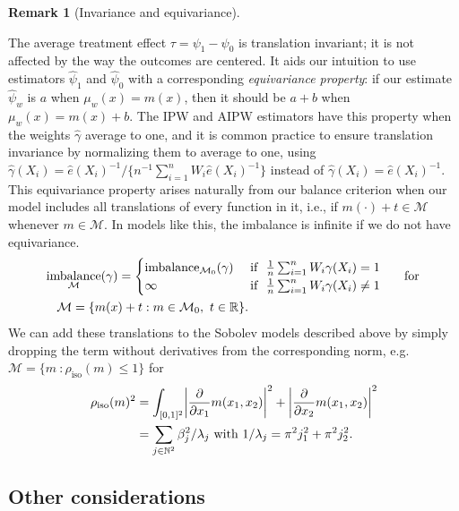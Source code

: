 \documentclass{article}
\DeclarePairedDelimiter\abs{\lvert}{\rvert}
\DeclarePairedDelimiter\set{\{}{\}}
\theoremstyle{definition}
\newtheorem{remark}{Remark}
\newcommand{\R}{\ensuremath{\mathbb{R}}}
\DeclareMathOperator{\imbalance}{imbalance}
\newcommand{\model}{\mathcal{M}}
\newcommand{\<}{\langle}
\renewcommand{\>}{\rangle}
\begin{document}


\begin{remark}[Invariance and equivariance]
\label{sec:translation-invariance}

The average treatment effect $\tau = \psi_1 - \psi_0$ is translation invariant; it is not affected by the way the outcomes are centered. It aids our intuition to use estimators $\hat\psi_1$ and $\hat\psi_0$ with a corresponding \emph{equivariance property}: if our estimate $\hat\psi_w$ is $a$ when $\mu_w(x)=m(x)$, then it should be $a + b$ when $\mu_w(x)=m(x) + b$. The IPW and AIPW estimators have this property when the weights $\hat\gamma$ average to one, and it is common practice to ensure translation invariance by normalizing them to average to one, using $\hat\gamma(X_i) = \hat e(X_i)^{-1} / \{ n^{-1} \sum_{i=1}^n W_i \hat e(X_i)^{-1}\}$ instead of $\hat \gamma(X_i)=\hat e(X_i)^{-1}$.
This equivariance property arises naturally from our balance criterion when our model includes all translations of every function in it, i.e., if $m(\cdot) + t \in \model$ whenever $m \in \model$. In models like this, the imbalance is infinite if we do not have equivariance.
  \[
   \begin{aligned}
   &\imbalance_{\model}(\gamma) =
     \begin{cases}
       \imbalance_{\model_0}(\gamma) & \text{ if }\ \frac{1}{n}\sum_{i=1}^n W_i \gamma(X_i) = 1\\
       \infty &  \text{ if }\ \frac{1}{n}\sum_{i=1}^n W_i \gamma(X_i) \neq 1
   \end{cases}
   \quad\ \text{ for } \\ &\quad \model = \set*{ m(x) + t : m \in \model_0,\  t \in \R}.
  \end{aligned}
   \]
We can add these translations to the Sobolev models described above by simply dropping the term without derivatives from the corresponding norm, e.g. $\model = \{ m \ : \rho_{\text{iso}}(m) \le 1 \}$ for
\begin{align}
\rho_{\text{iso}}(m)^2
&=  \int_{[0,1]^2}  \abs*{\frac{\partial }{\partial x_1}m(x_1,x_2)}^2 +
     \abs*{\frac{\partial }{\partial x_2}m(x_1,x_2)}^2  \label{eq:sobolev-seminorm-derivative}  \\
&= \sum_{j \in \mathbb{N}^2} \beta_j^2/\lambda_j \text{ with } 1/\lambda_j = \pi^2j_1^2 + \pi^2j_2^2.  \label{eq:sobolev-seminorm-fourier}
\end{align}
\end{remark}

\subsection{Other considerations}
\label{sec:other-considerations}
\end{document}
